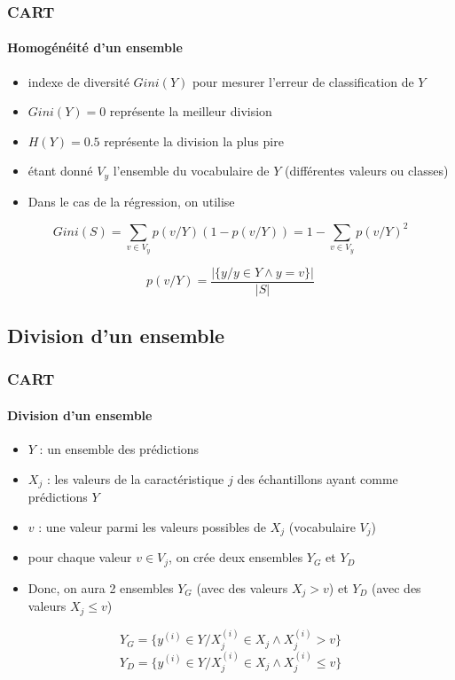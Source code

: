 \documentclass[xcolor=table]{beamer}
\begin{document}
\begin{frame}
	\frametitle{CART}
	\framesubtitle{Homogénéité d'un ensemble}
	
	\begin{itemize}
		\item indexe de diversité $Gini(Y)$ pour mesurer l'erreur de classification de $Y$
		\item $Gini(Y)=0$ représente la meilleur division
		\item $H(Y)=0.5$ représente la division la plus pire
		\item étant donné $V_y$ l'ensemble du vocabulaire de $Y$ (différentes valeurs ou classes)
		\item Dans le cas de la régression, on utilise 
	\end{itemize}
	
	\[Gini(S) = \sum\limits_{v \in V_y} p(v/Y) (1-p(v/Y)) = 1 - \sum\limits_{v \in V_y} p(v/Y)^2 \]
	
	\[p(v/Y) = \frac{|\{y / y \in Y \wedge y = v\}|}{|S|}\]
	
\end{frame}

\subsection{Division d'un ensemble}

\begin{frame}
	\frametitle{CART}
	\framesubtitle{Division d'un ensemble}
	
	\begin{itemize}
		\item $Y$ : un ensemble des prédictions 
		\item $X_j$ : les valeurs de la caractéristique $j$ des échantillons ayant comme prédictions $Y$
		\item $v$ : une valeur parmi les valeurs possibles de $X_j$ (vocabulaire $V_j$)
		\item pour chaque valeur $v \in V_j$, on crée deux ensembles $Y_G$ et $Y_D$
		\item Donc, on aura 2 ensembles $Y_G$ (avec des valeurs $X_j > v$) et $Y_D$ (avec des valeurs $X_j \le v$)
	\end{itemize}
	
	\[Y_G = \{y^{(i)} \in Y / X_j^{(i)} \in X_j \wedge X_j^{(i)} > v\}\]
	\[Y_D = \{y^{(i)} \in Y / X_j^{(i)} \in X_j \wedge X_j^{(i)} \le v\}\]
	
\end{frame}
\end{document}
